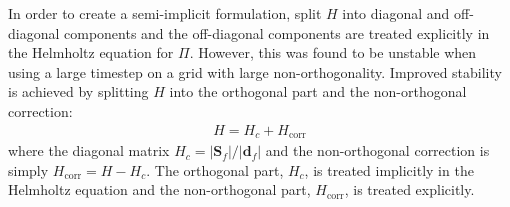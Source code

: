 \documentclass{ametsoc}
\begin{document}
In order to create a semi-implicit formulation, \cite{weller-shahrokhi2014} split \(H\) into diagonal and off-diagonal components and the off-diagonal components are treated explicitly in the Helmholtz equation for \(\Pi\).  However, this was found to be unstable when using a large timestep on a grid with large non-orthogonality.  Improved stability is achieved by splitting \(H\) into the orthogonal part and the non-orthogonal correction: 
\begin{align}
	H = H_c + H_\mathrm{corr}
\end{align}
where the diagonal matrix \(H_c=|\bm{S}_f|/|\bm{d}_f|\) and the non-orthogonal correction is simply \(H_\mathrm{corr} = H - H_c\).  The orthogonal part, \(H_c\), is treated implicitly in the Helmholtz equation and the non-orthogonal part, \(H_\mathrm{corr}\), is treated explicitly. 





\end{document}
